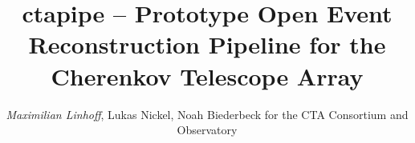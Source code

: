 \documentclass[aspectratio=1610, 9pt]{beamer}
\title{ctapipe -- Prototype Open Event Reconstruction Pipeline for the Cherenkov Telescope Array}
\author[M.~Linhoff]{\emph{Maximilian Linhoff}, Lukas Nickel, Noah Biederbeck for the CTA Consortium and Observatory}
\institute[TU Dortmund]{Astroparticle Physics}
\begin{document}
\maketitle

\begin{frame}
  
\end{frame}
\end{document}
